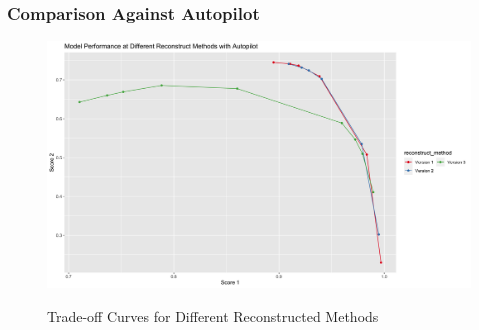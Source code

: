 \documentclass{article}
\begin{document}
\subsubsection{Comparison Against Autopilot}

\begin{figure}
    \caption{Trade-off Curves for Different Reconstructed  Methods}
    \centering
    \includegraphics{images/ModelPerformanceatDifferentReconstructMethodswithAutopilot.png}
    \label{fig:fig1.11.1}
\end{figure}
\end{document}
